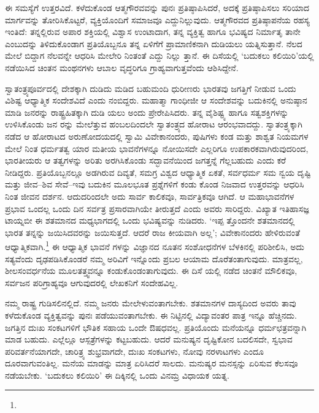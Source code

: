 ಈ ಸಮಸ್ಯೆಗೆ ಉತ್ತರವಿದೆ. ಕಳೆದುಕೊಂಡ ಆತ್ಮಗೌರವವನ್ನು ಪುನಃ ಪ್ರತಿಷ್ಠಾಪಿಸಿದರೆ, ಅದಕ್ಕೆ ಪ್ರತಿಷ್ಠಾಪಿಸಲು ಸರಿಯಾದ ಮಾರ್ಗವನ್ನು ತೋರಿಸಿಕೊಟ್ಟರೆ, ವ್ಯಕ್ತಿಯೊಂದಿಗೆ ಸಮಾಜವೂ ಎದ್ದುನಿಲ್ಲುವುದು. ಆತ್ಮಗೌರವದ ಪ್ರತಿಷ್ಠಾಪನೆಯ ರಹಸ್ಯ ಇಂತಿದೆ: ತನ್ನಲ್ಲಿರುವ ಅಪಾರ ಶಕ್ತಿಯಲ್ಲಿ ವಿಶ್ವಾಸ ಉಂಟಾದಾಗ, ತನ್ನ ವ್ಯಕ್ತಿತ್ವ ಹಾಗೂ ಭವಿಷ್ಯದ ನಿರ್ಮಾತೃ ತಾನೇ ಎಂಬುದನ್ನು ತಿಳಿದುಕೊಂಡಾಗ ಪ್ರತಿಯೊಬ್ಬನೂ ತನ್ನ ಏಳಿಗೆಗೆ ಪ್ರಾಮಾಣಿಕನಾಗಿ ದುಡಿಯಲು ಯತ್ನಿಸುತ್ತಾನೆ. ನೆಲದ ಮೇಲೆ ಬಿದ್ದಾಗ ನೆಲವನ್ನೇ ಆಧರಿಸಿ ಮೇಲೇರಿ ನಿಂತಂತೆ ಎದ್ದು ನಿಲ್ಲು ತ್ತಾನೆ. ಈ ದಿಸೆಯಲ್ಲಿ ‘ಬದುಕಲು ಕಲಿಯಿರಿ’ಯಲ್ಲಿ ನಡೆಯಿಸಿದ ಚಿಂತನ ಮಂಥನಗಳು ಆಬಾಲ ವೃದ್ಧರಿಗೂ ಗ್ರಾಹ್ಯವಾಗುತ್ತವೆಂದು ಆಶಿಸಿದ್ದೇನೆ.

ಸ್ವಾತಂತ್ರ್ಯಪೂರ್ವದಲ್ಲಿ ದೇಶಕ್ಕಾಗಿ ದುಡಿದು ಮಡಿದ ಬಹುಮಂದಿ ಧುರೀಣರು ಭಾರತವು ಜಗತ್ತಿಗೆ ನೀಡುವ ಒಂದು ವಿಶಿಷ್ಟ ಆಧ್ಯಾತ್ಮಿಕ ಸಂದೇಶವಿದೆ ಎಂದು ನಂಬಿದ್ದರು. ಮಹಾತ್ಮಾ ಗಾಂಧೀಜೀ ಆ ಸಂದೇಶವನ್ನು ಬದುಕಿನಲ್ಲಿ ಅನುಷ್ಠಾನ ಮಾಡಿ ಜನರನ್ನು ರಾಷ್ಟ್ರಹಿತಕ್ಕಾಗಿ ದುಡಿ ಯಲು ಅಂದು ಪ್ರೇರೇಪಿಸಿದರು. ತನ್ನ ವೈಶಿಷ್ಟ್ಯ ಹಾಗೂ ಸತ್ವಶಕ್ತಿಗಳನ್ನು ಉಳಿಸಿಕೊಂಡು ಜನ ರನ್ನು ಮೇಲೆತ್ತುವ ಹಂಬಲದಿಂದಲೇ ಸ್ವಾತಂತ್ರ್ಯದ ಹೋರಾಟ ಆರಂಭವಾದದ್ದು. ಸ್ವಾತಂತ್ರ್ಯಕ್ಕಾಗಿ ನಡೆದ ಆ ಹೋರಾಟದ ಅರುಣೋದಯದಲ್ಲಿ ಸ್ವಾಮಿ ವಿವೇಕಾನಂದರು, ಪುಷಿಗಳು ಕಂಡ ಮತ್ತು ಶಾಶ್ವತ ನಿಯಮಗಳ ಮೇಲೆ ನಿಂತ ಧರ್ಮತತ್ವ ಯಾರ ಮತೀಯ ಭಾವನೆಗಳನ್ನೂ ನೋಯಿಸದೇ ಎಲ್ಲರಿಗೂ ಉಪಕಾರಕವಾಗಿರುವುದರಿಂದ, ಭಾರತೀಯರು ಆ ತತ್ವಗಳನ್ನು ಅರಿತು ಅರಗಿಸಿಕೊಂಡು ಸದ್ಭಾವನೆಯಿಂದ ಜಗತ್ತನ್ನೆ ಗೆಲ್ಲಬಹುದು ಎಂದು ಕರೆ ನೀಡಿದ್ದರು. ಪ್ರತಿಯೊಬ್ಬನಲ್ಲೂ ಅಡಗಿರುವ ದಿವ್ಯತೆ, ಸಮಗ್ರ ವಿಶ್ವದ ಆಧ್ಯಾತ್ಮಿಕ ಏಕತೆ, ಸರ್ವಧರ್ಮ ಸಮ ನ್ವಯ ದೃಷ್ಟಿ ಮತ್ತು ಜೀವ–ಶಿವ ಸೇವೆ–ಇವು ಬದುಕಿನ ಮೂಲಭೂತ ಪ್ರಶ್ನೆಗಳಿಗೆ ಕಂಡು ಕೊಂಡ ನಿಜವಾದ ಉತ್ತರವನ್ನು ಆಧರಿಸಿ ನಿಂತ ಜೀವನ ದರ್ಶನ. ಆದುದರಿಂದಲೇ ಅದು ಸಾರ್ವ ಕಾಲಿಕವೂ, ಸಾರ್ವತ್ರಿಕವೂ ಆಗಿದೆ. ಆ ಮಹಾಭಾವನೆಗಳ ಪ್ರಭಾವ ಒಂದಲ್ಲ ಒಂದು ದಿನ ಸರ್ವತ್ರ ಪ್ರಸಾರವಾಗಿಯೇ ತೀರುತ್ತದೆ ಎಂದು ಅವರು ಸಾರಿದ್ದರು. ವಿಖ್ಯಾತ ಇತಿಹಾಸಜ್ಞ ಟಾಯ್ನಬೀ ಈ ಶತಮಾನದ ಮಧ್ಯಭಾಗದಲ್ಲಿ ಒಂದು ಭವಿಷ್ಯವನ್ನು ನುಡಿದರು. ‘ಇಪ್ಪ ತ್ತೊಂದನೇ ಶತಮಾನದಲ್ಲಿ ಭಾರತ ತನ್ನನ್ನು ಜಯಿಸಿದವರನ್ನು ಜಯಿಸುತ್ತದೆ. ಆದರೆ ರಾಜ ಕೀಯವಾಗಿ ಅಲ್ಲ’; ವಿವೇಕಾನಂದರು ಹೇಳಿರುವಂತೆ ಆಧ್ಯಾತ್ಮಿಕವಾಗಿ.\footnote{\hfill{}} ಈ ಆಧ್ಯಾತ್ಮಿಕ ಭಾವನೆ ಗಳನ್ನು ವಿಜ್ಞಾನದ ನೂತನ ಸಂಶೋಧನೆಗಳ ಬೆಳಕಿನಲ್ಲಿ ಪರಿಶೀಲಿಸಿ, ಅದು ಸತ್ಯವೆಂದು ದೃಢಪಡಿಸಿಕೊಂಡರೆ ನಮ್ಮ ಅರಿವಿಗೆ ಇನ್ನೊಂದು ಪ್ರಬಲ ಆಯಾಮ ದೊರೆತಂತಾಗುವುದು. ಮಾತ್ರವಲ್ಲ, ಶೀಲಸಂವರ್ಧನೆಯ ಮೂಲತತ್ತ್ವವನ್ನೂ ಕಂಡುಕೊಂಡಂತಾಗುವುದು. ಈ ದಿಸೆ ಯಲ್ಲಿ ನಡೆದ ಚಿಂತನೆ ಮೌಲಿಕವೂ, ಸರ್ವಜನ ಪರಿಗ್ರಾಹ್ಯವೂ ಆಗುವುದರಲ್ಲಿ ಲೇಖಕನಿಗೆ ಸಂದೇಹವಿಲ್ಲ.

ನಮ್ಮ ರಾಷ್ಟ್ರ ಗುಡಿಸಲಿನಲ್ಲಿದೆ. ನಮ್ಮ ಜನರು ಮೇಲೇಳುವಂತಾಗಬೇಕು. ಶತಮಾನಗಳ ದಾಸ್ಯದಿಂದ ಅವರು ತಾವು ಕಳೆದುಕೊಂಡ ವ್ಯಕ್ತಿತ್ವವನ್ನು ಪುನಃ ಪಡೆಯುವಂತಾಗಬೇಕು. ಈ ನಿಟ್ಟಿನಲ್ಲಿ ವಿದ್ಯಾವಂತರ ಪಾತ್ರ ಇನ್ನೂ ಹೆಚ್ಚಿನದು. ಜಗತ್ತಿನ ದುಃಖ ಸಂಕಟಗಳಿಗೆ ಭೌತಿಕ ಸಹಾಯ ಒಂದೇ ಔಷಧವಲ್ಲ. ಪ್ರತಿಯೊಂದು ಮನೆಯನ್ನೂ ಧರ್ಮಛತ್ರವನ್ನಾಗಿ ಮಾಡ ಬಹುದು. ಎಲ್ಲೆಲ್ಲೂ ಆಸ್ಪತ್ರೆಗಳನ್ನು ಕಟ್ಟಬಹುದು. ಆದರೆ ಮನುಷ್ಯನ ದೃಷ್ಟಿಕೋನ ಬದಲಿಸದೇ, ಸ್ವಭಾವ ಪರಿವರ್ತನೆಯಾಗದೇ, ಚಾರಿತ್ರ್ಯ ಶುಭ್ರವಾಗದೇ, ದುಃಖ ಸಂಕಟಗಳು, ನೋವು ನರಳಾಟಗಳು ಎಂದೂ ದೂರವಾಗುವಂತಿಲ್ಲ. ಮನೆಯ ಮಾಡನ್ನು ಮಾತ್ರ ಏರಿಸಿದರೆ ಸಾಲದು. ಮನುಷ್ಯರ ಮನಸ್ಸನ್ನು ಏರಿಸುವ ಕೆಲಸವೂ ನಡೆಯಬೇಕು. ‘ಬದುಕಲು ಕಲಿಯಿರಿ’ ಈ ದಿಕ್ಕಿನಲ್ಲಿ ಒಂದು ವಿನಮ್ರ ವಿಧಾಯಕ ಯತ್ನ.

